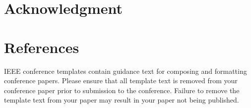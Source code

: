 \documentclass[conference]{IEEEtran}
\begin{document}
\section*{Acknowledgment}

\section*{References}

\balance





\vspace{12pt}
\color{red}
IEEE conference templates contain guidance text for composing and formatting conference papers. Please ensure that all template text is removed from your conference paper prior to submission to the conference. Failure to remove the template text from your paper may result in your paper not being published.
\end{document}
